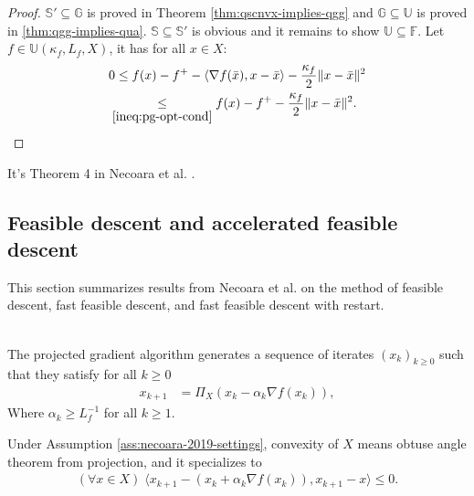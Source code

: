 \documentclass[12pt]{report}
\begin{document}
            \begin{proof}
                $\mathbb S' \subseteq \mathbb G$ is proved in Theorem \ref{thm:qscnvx-implies-qgg} and $\mathbb G \subseteq \mathbb U$ is proved in \ref{thm:qgg-implies-qua}. 
                $\mathbb S\subseteq \mathbb S'$ is obvious and it remains to show $\mathbb U \subseteq \mathbb F$. 
                Let $f\in \mathbb U(\kappa_f, L_f, X)$, it has for all $x \in X$: 
                \begin{align*}
                    0 &\le f(x) - f^+ - \langle \nabla f(\bar x), x - \bar x\rangle - \frac{\kappa_f}{2}\Vert x - \bar x\Vert^2
                    \\
                    &\hspace{-0.5em}\underset{\eqref{ineq:pg-opt-cond}}{\le} 
                    f(x) - f^+ - \frac{\kappa_f}{2}\Vert x - \bar x\Vert^2. 
                \end{align*}
            \end{proof}
            \begin{remark}
                It's Theorem 4 in Necoara et al. \cite{necoara_linear_2019}.
            \end{remark}

        \subsection{Feasible descent and accelerated feasible descent}
            This section summarizes results from Necoara et al. on the method of feasible descent, fast feasible descent, and fast feasible descent with restart. 
            \begin{definition}\label{def:projg-alg}\;\\
                The projected gradient algorithm generates a sequence of iterates $(x_k)_{k \ge 0}$ such that they satisfy for all $k \ge 0$
                \begin{align*}
                    x_{k + 1} &= \Pi_X(x_k - \alpha_k \nabla f(x_k)), 
                \end{align*}
                Where $\alpha_k \ge L_f^{-1}$ for all $k \ge 1$. 
            \end{definition}
            Under Assumption \ref{ass:necoara-2019-settings}, convexity of $X$ means obtuse angle theorem from projection, and it specializes to 
            \begin{align}\label{ineq:projg-variational-ineq}
                (\forall x \in X)\; \langle x_{k + 1} - (x_k + \alpha_k \nabla f(x_k)), x_{k + 1} - x\rangle \le 0. 
            \end{align}
\end{document}
